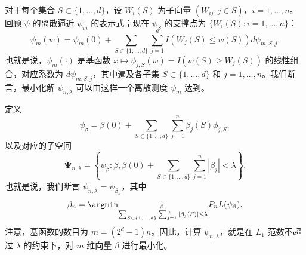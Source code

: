 对于每个集合 $S\subset\{1,\ldots,d\}$，设 $W_i(S)$ 为子向量 $(W_{ij}:j\in S)$，$i=1,\ldots,n$。回顾 $\psi$ 的离散逼近 $\psi_m$ 的表示式；现在 $\psi_S$ 的支撑点为 $\{W_i(S):i=1,\ldots,n\}$：
\[
 \psi_m(w)=\psi_m(0)+\sum_{S\subset\{1,\ldots,d\}}\sum_{j=1}^n
                    I(W_j(S)\leq w(S))d\psi_{m,S,j}.
\]
也就是说，$\psi_m(\cdot)$ 是基函数 $x\mapsto\phi_{j,S}(w)=I(w(S)\geq W_j(S))$ 的线性组合，对应系数为 $d\psi_{m,S,j}$，其中遍及各子集 $S\subset\{1,\ldots,d\}$ 和 $j=1,\ldots,n$。我们断言，最小化解 $\psi_{n,\lambda}$ 可以由这样一个离散测度 $\psi_m$ 达到。

定义
\[
 \psi_\beta=\beta(0)+\sum_{S\subset\{1,\ldots,d\}}\sum_{j=1}^n
                          \beta_j(S)\phi_{j,S},
\]
以及对应的子空间
\[
 \boldsymbol{\Psi}_{n,\lambda}
   =\left\{\psi_\beta:\beta,\beta(0)+
     \sum_{S\subset\{1,\ldots,d\}}\sum_{j=1}^n|\beta_j|<\lambda\right\}.
\]
也就是说，我们断言 $\psi_{n,\lambda}=\psi_{\beta_n}$，其中
\[
 \beta_n=\argmin_{\substack{\beta,\\
              \sum_{S\subset\{1,\ldots,d\}}\sum_{j=1}^n|\beta_j(S)|\leq\lambda}}
               P_nL(\psi_\beta).
\]
注意，基函数的数目为 $m=(2^d-1)n$。因此，计算 $\psi_{n,\lambda}$，就是在 $L_1$ 范数不超过 $\lambda$ 的约束下，对 $m$ 维向量 $\beta$ 进行最小化。
